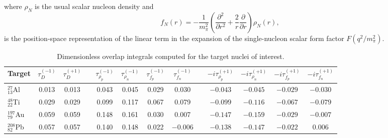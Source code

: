 \documentclass{book}[letterpaper,12pt]
\begin{document}
where $\rho_N$ is the usual scalar nucleon density and
\begin{equation}
f_N(r)=-\frac{1}{m_{\pi}^2}\left(\frac{\partial^2}{\partial r^2}+\frac{2}{r}\frac{\partial}{\partial r}\right)\rho_N(r),
\end{equation}
is the position-space representation of the linear term in the expansion of the single-nucleon scalar form factor $F(q^2/m_{\pi}^2)$.
\begin{table}
\centering
{\renewcommand{\arraystretch}{1.5}
\begin{tabular}{lcccccccccccc}
\hline
\hline
Target & $\tau_D^{(-1)}$ & $\tau_D^{(+1)}$ & & $\tau_{\rho_p}^{(-1)}$ & $\tau_{\rho_n}^{(-1)}$ & $\tau_{f_p}^{(-1)}$ & $\tau_{f_n}^{(-1)}$ & & $-i\tau_{\rho_p}^{(+1)}$ & $-i\tau_{\rho_n}^{(+1)}$ & $-i\tau_{f_p}^{(+1)}$ & $-i\tau_{f_n}^{(+1)}$\\
\hline
$^{27}_{13}$Al & 0.013 & 0.013 & & 0.043 & 0.045 & 0.029 & 0.030 & & $-0.043$ & $-0.045$ & $-0.029$ & $-0.030$ \\
$^{48}_{22}$Ti & 0.029 & 0.029 & & 0.099 & 0.117 & 0.067 & 0.079 & & $-0.099$ & $-0.116$ & $-0.067$ & $-0.079$ \\
$^{197}_{79}$Au & 0.059 & 0.059 & & 0.148 & 0.161 & 0.030 & 0.007 & & $-0.147$ & $-0.159$ & $-0.029$ & $-0.007$\\
$^{208}_{82}$Pb & 0.057 & 0.057 & & 0.140 & 0.148 & 0.022 & $-0.006$ & & $-0.138$ & $-0.147$ & $-0.022$ & $0.006$\\ 
\hline
\hline
\end{tabular}
}
\caption{Dimensionless overlap integrals computed for the target nuclei of interest.}
\label{tab:overlaps}
\end{table}
\end{document}

